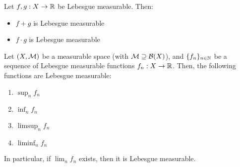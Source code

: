 \begin{fcorollary}
    Let $f, g: X \to \mathbb{R}$ be Lebesgue measurable. Then:
    \vspace{1em}
    \begin{itemize}
        \item $f + g$ is Lebesgue measurable
        \vspace{1em}
        \item $f \cdot g$ is Lebesgue measurable
    \end{itemize}

\end{fcorollary}

\vspace{1em}

\begin{fproposition}
    Let $(X, \mathcal{M})$ be a measurable space (with $\mathcal{M} \supseteq \mathcal{B}(X)$), and
    $\{f_n\}_{n \in \mathbb{N}}$ be a sequence of Lebesgue measurable functions $f_n: X \to \mathbb{R}$.
    Then, the following functions are Lebesgue measurable:

    \vspace{1em}

    \begin{enumerate}
        \item $\sup_{n} f_n$
        \vspace{1em}
        \item $\inf_{n} f_n$
        \vspace{1em}
        \item $\limsup_{n} f_n$
        \vspace{1em}
        \item $\liminf_{n} f_n$
    \end{enumerate}

    In particular, if $\lim_{n} f_n$ exists, then it is Lebesgue measurable.

\end{fproposition}

